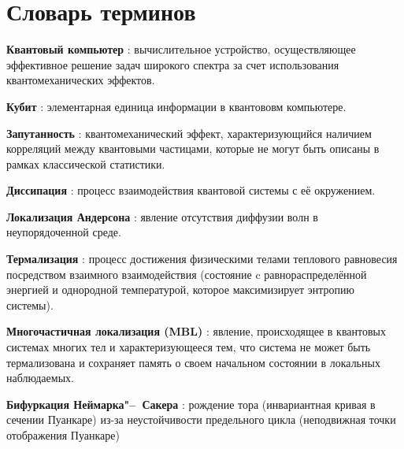 \chapter*{Словарь терминов}             %

\textbf{Квантовый компьютер} : вычислительное устройство, осуществляющее эффективное решение задач широкого спектра за счет использования квантомеханических эффектов.

\textbf{Кубит} : элементарная единица информации в квантововм компьютере.

\textbf{Запутанность} : квантомеханический эффект, характеризующийся наличием корреляций между квантовыми частицами, которые не могут быть описаны в рамках классической статистики.

\textbf{Диссипация} : процесс взаимодействия квантовой системы с её окружением.

\textbf{Локализация Андерсона} : явление отсутствия диффузии волн в неупорядоченной среде.

\textbf{Термализация} : процесс достижения физическими телами теплового равновесия посредством взаимного взаимодействия (состояние c равнораспределённой энергией и однородной температурой, которое максимизирует энтропию системы). 

\textbf{Многочастичная локализация (MBL)} : явление, происходящее в квантовых системах многих тел и характеризующееся тем, что система не может быть термализована и сохраняет память о своем начальном состоянии в локальных наблюдаемых.

\textbf{Бифуркация Неймарка"--~Сакера} : рождение тора (инвариантная кривая в сечении Пуанкаре) из-за неустойчивости предельного цикла (неподвижная точки отображения Пуанкаре)


